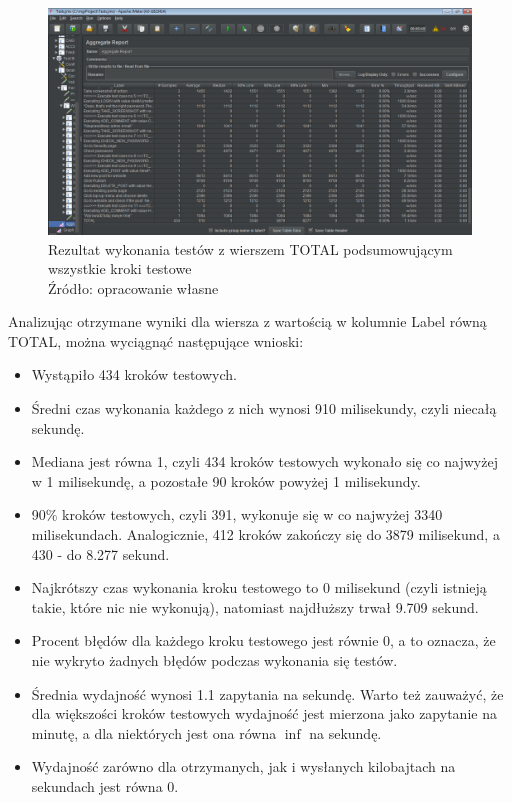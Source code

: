 \begin{figure}[H]
\centering
\captionsetup{justification=centering}
\includegraphics[width=1.05\textwidth]{aggregate.PNG}
\caption[Rezultat wykonania testów z wierszem TOTAL podsumowującym wszystkie kroki testowe]{\label{fig:ham}Rezultat wykonania testów z wierszem TOTAL podsumowującym wszystkie kroki testowe  \\ Źródło: opracowanie własne}
\end{figure}

Analizując otrzymane wyniki dla wiersza z wartością w kolumnie Label równą TOTAL, można wyciągnąć następujące wnioski:
\begin{itemize}
    \item Wystąpiło 434 kroków testowych.
    \item Średni czas wykonania każdego z nich wynosi 910 milisekundy, czyli niecałą sekundę.
    \item Mediana jest równa 1, czyli 434 kroków testowych wykonało się co najwyżej w 1 milisekundę, a pozostałe 90 kroków powyżej 1 milisekundy.
    \item 90\% kroków testowych, czyli 391, wykonuje się w co najwyżej 3340 milisekundach. Analogicznie, 412 kroków zakończy się do 3879 milisekund, a 430 - do 8.277 sekund.
    \item Najkrótszy czas wykonania kroku testowego to 0 milisekund (czyli istnieją takie, które nic nie wykonują), natomiast najdłuższy trwał 9.709 sekund.
    \item Procent błędów dla każdego kroku testowego jest równie 0, a to oznacza, że nie wykryto żadnych błędów podczas wykonania się testów.
    \item Średnia wydajność wynosi 1.1 zapytania na sekundę. Warto też zauważyć, że dla większości kroków testowych wydajność jest mierzona jako zapytanie na minutę, a dla niektórych jest ona równa $\inf$ na sekundę.
    \item Wydajność zarówno dla otrzymanych, jak i wysłanych kilobajtach na sekundach jest równa 0.
\end{itemize}


